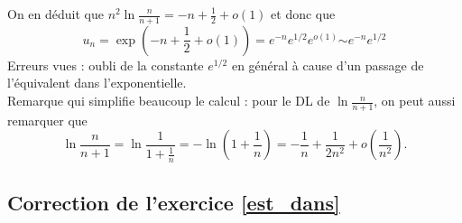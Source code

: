 \documentclass[11pt,a4paper]{article}
\begin{document}
\begin{enumerate}
On en déduit que $n^2 \ln \frac{n}{n+1} = -n+\frac12 + o(1)$ et donc que 
\[ u_n =\exp \left( -n+\frac12 + o(1)\right) 
= e^{-n}e^{1/2}e^{o(1)} 
\boxed{\sim e^{-n}e^{1/2}}
 \]
Erreurs vues : oubli de la constante $e^{1/2}$ en général à cause d'un passage de l'équivalent dans l'exponentielle.\\
Remarque qui simplifie beaucoup le calcul : pour le DL de $\ln \frac{n}{n+1}$, on peut aussi remarquer que 
\[ \ln \frac{n}{n+1} 
= \ln \frac{1}{1+\frac1n} 
= -\ln\left(1+\frac1n\right)
= -\frac1n + \frac{1}{2n^2}+ o\left(\frac{1}{n^2}\right).
\]

\end{enumerate}



\subsection*{Correction de l'exercice \ref{est_dans}}
\end{document}
